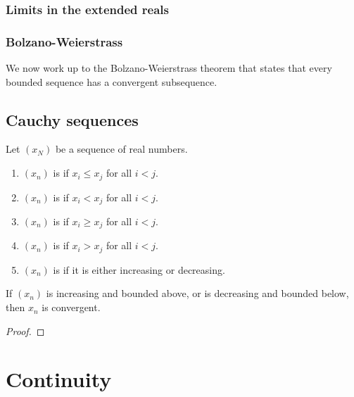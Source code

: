 \subsubsection{Limits in the extended reals}\label{sec:real-analysis:limits-extend-reals}


\subsubsection{Bolzano-Weierstrass}\label{sec:real-analysis:bolzano-weierstrass}
We now work up to the Bolzano-Weierstrass theorem that states that every bounded sequence has a convergent subsequence.

\subsection{Cauchy sequences}\label{sec:real-analysis:cauchy-sequences}

\begin{definition}
  Let \((x_{N})\) be a sequence of real numbers.
  \begin{enumerate}
  \item \((x_{n})\) is  if \(x_{i} \leq x_{j}\) for all \(i < j\).
  \item \((x_{n})\) is  if \(x_{i} < x_{j}\) for all \(i < j\).
  \item \((x_{n})\) is  if \(x_{i} \geq x_{j}\) for all \(i < j\).
  \item \((x_{n})\) is  if \(x_{i} > x_{j}\) for all \(i < j\).
  \item \((x_{n})\) is  if it is either increasing or decreasing.
  \end{enumerate}
\end{definition}

\begin{theorem}\label{thm:real-analysis:monotone-convergence-theorem}
  If \((x_{n})\) is increasing and bounded above, or is decreasing and bounded below, then \(x_{n}\) is convergent.
\end{theorem}

\begin{proof}
\end{proof}


\section{Continuity}

